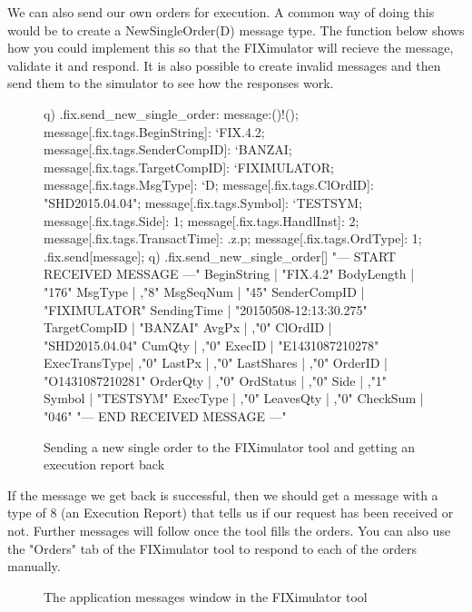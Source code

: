 We can also send our own orders for execution. A common way of doing this would be to create a NewSingleOrder(D) message type. The function below shows how you could implement this so that
the FIXimulator will recieve the message, validate it and respond. It is also possible to create invalid messages and then send them to the simulator to see how the responses work.

\begin{figure}[H]
\begin{qcode}
q) .fix.send_new_single_order:{
	message:()!();
	message[.fix.tags.BeginString]: `FIX.4.2;
	message[.fix.tags.SenderCompID]: `BANZAI;
	message[.fix.tags.TargetCompID]: `FIXIMULATOR;
	message[.fix.tags.MsgType]: `D;
	message[.fix.tags.ClOrdID]: "SHD2015.04.04";
	message[.fix.tags.Symbol]: `TESTSYM;
	message[.fix.tags.Side]: 1;
	message[.fix.tags.HandlInst]: 2;
	message[.fix.tags.TransactTime]: .z.p;
	message[.fix.tags.OrdType]: 1;
	.fix.send[message]; }
q) .fix.send_new_single_order[]
"--- START RECEIVED MESSAGE ---"
BeginString  | "FIX.4.2"
BodyLength   | "176"
MsgType      | ,"8"
MsgSeqNum    | "45"
SenderCompID | "FIXIMULATOR"
SendingTime  | "20150508-12:13:30.275"
TargetCompID | "BANZAI"
AvgPx        | ,"0"
ClOrdID      | "SHD2015.04.04"
CumQty       | ,"0"
ExecID       | "E1431087210278"
ExecTransType| ,"0"
LastPx       | ,"0"
LastShares   | ,"0"
OrderID      | "O1431087210281"
OrderQty     | ,"0"
OrdStatus    | ,"0"
Side         | ,"1"
Symbol       | "TESTSYM"
ExecType     | ,"0"
LeavesQty    | ,"0"
CheckSum     | "046"
"---  END RECEIVED MESSAGE  ---"
\end{qcode}
\caption{Sending a new single order to the FIXimulator tool and getting an execution report back}
\end{figure}

If the message we get back is successful, then we should get a message with a type of 8 (an Execution Report) that tells us if our request has been received or not. Further messages will follow once the
tool fills the orders. You can also use the "Orders" tab of the FIXimulator tool to respond to each of
the orders manually.

\begin{figure}[H]
\centering
{}
\caption{The application messages window in the FIXimulator tool}
\label{fig:application-messages}
\end{figure}

